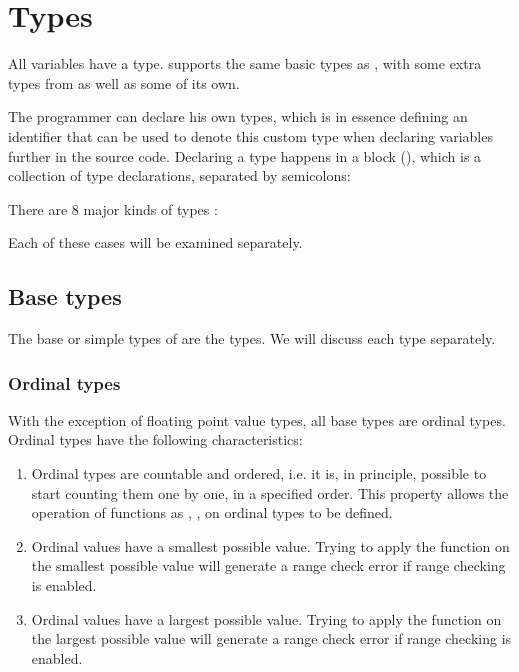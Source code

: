 \chapter{Types}
All variables have a type. \fpc supports the same basic types as \tp, with
some extra types from \delphi as well as some of its own.

The programmer can declare his own types, which is in essence defining an identifier
that can be used to denote this custom type when declaring variables further
in the source code. Declaring a type happens
in a  block (), which is a collection of type declarations, separated
by semicolons:

There are 8 major kinds of types :

Each of these cases will be examined separately.

\section{Base types}
The base or simple types of \fpc are the \delphi types.
We will discuss each type separately.

\subsection{Ordinal types}
With the exception of floating point value types, all base types are ordinal 
types. Ordinal types have the following characteristics:
\begin{enumerate}
\item Ordinal types are countable and ordered, i.e. it is, in principle,
possible to start counting them one by one, in a specified order.
This property allows the operation of functions as , ,
on ordinal types to be defined.
\item Ordinal values have a smallest possible value. Trying to apply the
 function on the smallest possible value will generate a range
check error if range checking is enabled.
\item Ordinal values have a largest possible value. Trying to apply the
 function on the largest possible value will generate a range
check error if range checking is enabled.
\end{enumerate}

